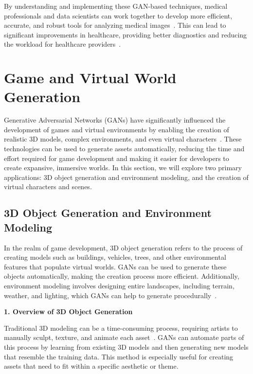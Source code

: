 By understanding and implementing these GAN-based techniques, medical professionals and data scientists can work together to develop more efficient, accurate, and robust tools for analyzing medical images~\cite{razzak2018deep}. This can lead to significant improvements in healthcare, providing better diagnostics and reducing the workload for healthcare providers~\cite{xia2022gan}.


\section{Game and Virtual World Generation}

Generative Adversarial Networks (GANs) have significantly influenced the development of games and virtual environments by enabling the creation of realistic 3D models, complex environments, and even virtual characters~\cite{li2018semantic}. These technologies can be used to generate assets automatically, reducing the time and effort required for game development and making it easier for developers to create expansive, immersive worlds. In this section, we will explore two primary applications: 3D object generation and environment modeling, and the creation of virtual characters and scenes.

\subsection{3D Object Generation and Environment Modeling}

In the realm of game development, 3D object generation refers to the process of creating models such as buildings, vehicles, trees, and other environmental features that populate virtual worlds. GANs can be used to generate these objects automatically, making the creation process more efficient. Additionally, environment modeling involves designing entire landscapes, including terrain, weather, and lighting, which GANs can help to generate procedurally~\cite{li2018semantic}.

\textbf{1. Overview of 3D Object Generation}

Traditional 3D modeling can be a time-consuming process, requiring artists to manually sculpt, texture, and animate each asset~\cite{li2021sp}. GANs can automate parts of this process by learning from existing 3D models and then generating new models that resemble the training data. This method is especially useful for creating assets that need to fit within a specific aesthetic or theme.

